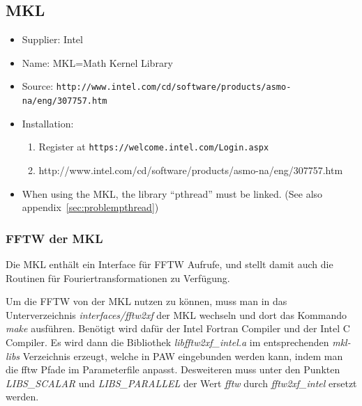 \documentclass[a4paper,10pt]{report}
\newcommand{\mytt}[1]{{\tt #1}}
\begin{document}
\subsection{MKL}
\begin{itemize}
\item Supplier: Intel
\item Name: MKL=Math Kernel Library
\item Source: \mytt{http://www.intel.com/cd/software/products/asmo-na/eng/307757.htm}
\item Installation:
\begin{enumerate}
\item Register at \mytt{https://welcome.intel.com/Login.aspx}
\item http://www.intel.com/cd/software/products/asmo-na/eng/307757.htm
\end{enumerate}
\item When using the MKL, the library ``pthread'' must be linked. (See
also appendix~\ref{sec:problempthread})
\end{itemize}


\subsubsection{FFTW der MKL}
Die MKL enth\"alt ein Interface f\"ur FFTW Aufrufe, und stellt damit
auch die Routinen f\"ur Fouriertransformationen zu Verf\"ugung.

Um die FFTW von der MKL nutzen zu können, muss man in das
Unterverzeichnis \textit{interfaces/fftw2xf} der MKL wechseln und dort
das Kommando \textit{make} ausführen. Benötigt wird dafür der Intel
Fortran Compiler und der Intel C Compiler.  Es wird dann die
Bibliothek \textit{libfftw2xf\_intel.a} im entsprechenden
\textit{mkl-libs} Verzeichnis erzeugt, welche in PAW eingebunden
werden kann, indem man die fftw Pfade im Parameterfile anpasst.
Desweiteren muss unter den Punkten \textit{LIBS\_SCALAR }und
\textit{LIBS\_PARALLEL} der Wert \textit{fftw} durch
\textit{fftw2xf\_intel }ersetzt werden.


\end{document}
